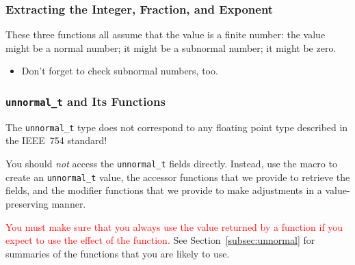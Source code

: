 \subsubsection{Extracting the Integer, Fraction, and Exponent}

These three functions all assume that the value is a finite number:
the value might be a normal number;
it might be a subnormal number;
it might be zero.

\begin{description}
    \begin{itemize}
        \item Don't forget to check subnormal numbers, too.
    \end{itemize}
\end{description}


\subsubsection{\texttt{unnormal\_t} and Its Functions}

\hspace{-2cm}\colorbox{red!25}{The \lstinline{unnormal_t} type does not correspond to any floating point type described in the IEEE~754 standard!}

You should \textit{not} access the \lstinline{unnormal_t} fields directly.
Instead, use the  macro to create an \lstinline{unnormal_t} value, the accessor functions that we provide to retrieve the fields, and the modifier functions that we provide to make adjustments in a value-preserving manner.

\textcolor{red}{You must make sure that you always use the value returned by a function if you expect to use the effect of the function.}
See Section~\ref{subsec:unnormal} for summaries of the functions that you are likely to use.


